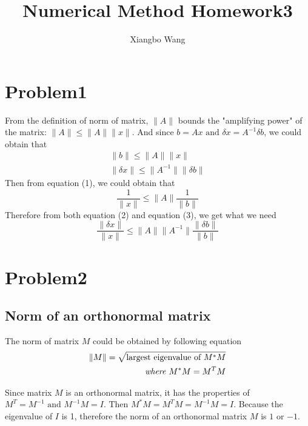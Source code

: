 \documentclass[11pt]{article}
\title{Numerical Method Homework3}
\author{Xiangbo Wang}
\begin{document}
	\maketitle
	\section{Problem1}
	\setlength{\parindent}{2em}
	\par From the definition of norm of matrix, $\|A\|$ bounds the "amplifying power" of the matrix: $\|A\| \leq \|A\|\|x\|$. And since $b = Ax \mbox{ and } \delta x = A^{-1}\delta b$, we could obtain that
	\begin{eqnarray}
		\|b\| \leq \|A\|\|x\|\\
		\|\delta x\| \leq \|A^{-1}\|\|\delta b\|
	\end{eqnarray}
	Then from equation (1), we could obtain that \begin{equation}\frac{1}{\|x\|} \leq \|A\|\frac{1}{\|b\|}\end{equation} Therefore from both equation (2) and equation (3), we get what we need
	\begin{equation}
		\frac{\|\delta x\|}{\|x\|} \leq \|A\|\|A^{-1}\|\frac{\|\delta b\|}{\|b\|}
	\end{equation}
	\section{Problem2}
	\setlength{\parindent}{2em}
	\subsection{Norm of an orthonormal matrix}
	\par The norm of matrix $M$ could be obtained by following equation
	\begin{equation}\begin{split}
		\|M\| = \sqrt{\mbox{largest eigenvalue of }M^*M}\\
		\mbox{\begin{itshape}where \end{itshape}}M^*M = M^TM
	\end{split}\end{equation}
	\par Since matrix $M$ is an orthonormal matrix, it has the properties of \(M^T = M^{-1}\mbox{ and }M^{-1}M = I\mbox{. Then }M^*M = M^TM = M^{-1}M = I\). Because the eigenvalue of $I$ is 1, therefore the norm of an orthonormal matrix $M$ is \(1\mbox{ or }{-1}\).	
\end{document}
